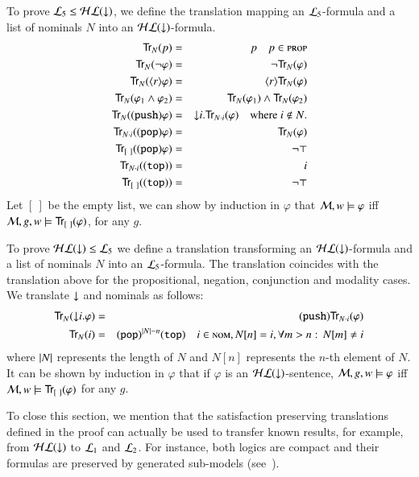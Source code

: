 \begin{pf}
To prove $\mathcal{L}_5 \le \mathcal{HL}({\downarrow})$, we define
the translation mapping an $\mathcal{L}_5$-formula and a list of
nominals $N$ into an $\mathcal{HL}({\downarrow})$-formula.
\begin{eqnarray*}
{\sf Tr}_N(p) & = & p \quad p \in \textsc{prop}\\
{\sf Tr}_N(\lnot \varphi) & = & \lnot {\sf Tr}_N(\varphi) \\
{\sf Tr}_N(\langle r \rangle \varphi) & = & \langle r \rangle {\sf Tr}_N(\varphi) \\
{\sf Tr}_N(\varphi_1 \land \varphi_2) & = & {\sf Tr}_N(\varphi_1) \land {\sf Tr}_N(\varphi_2)\\
{\sf Tr}_N({\tt (push)} \varphi) & = & {\downarrow} i. {\sf Tr}_{N\cdot i}(\varphi) \quad
\textrm{where $i \notin N$.}\\
{\sf Tr}_{N\cdot i}({\tt (pop)} \varphi) & = & {\sf Tr}_{N}(\varphi)\\
{\sf Tr}_{[\ ]}({\tt (pop)} \varphi) & = & \lnot\top\\
{\sf Tr}_{N\cdot i}({\tt (top)}) & = & i\\
{\sf Tr}_{[\ ]}({\tt (top)}) & = & \lnot\top
\end{eqnarray*}
Let $[\ ]$ be the empty list, we can show
by induction in $\varphi$ that $\mathcal{M}, w \models
\varphi$ iff $\mathcal{M}, g, w \models {\sf Tr}_{[\ ]}(\varphi)$, for any $g$.
\smallskip

\noindent
To prove $\mathcal{HL}({\downarrow}) \le \mathcal{L}_5$ we define a translation transforming an
$\mathcal{HL}({\downarrow})$-formula and a list of nominals $N$ into an $\mathcal{L}_5$-formula.
The translation coincides with the translation above for the propositional, negation,
conjunction and modality cases. We translate ${\downarrow}$ and nominals as follows:
\begin{eqnarray*}
{\sf Tr}_N({\downarrow} i.\varphi) & = & {\tt (push)}{\sf Tr}_{N\cdot i}(\varphi)\\
{\sf Tr}_N(i) & = & {\tt (pop)}^{|N|-n}{\tt (top)} \quad i \in \textsc{nom}, N[n]=i,
\forall m>n:\, N[m]\not=i
\end{eqnarray*}
where $|N|$ represents the length of $N$ and $N[n]$ represents the $n$-th element
of $N$.
It can be shown by induction in $\varphi$ that if $\varphi$ is an
$\mathcal{HL}({\downarrow})$-sentence, $\mathcal{M}, g, w \models
\varphi$ iff $\model, w \models \Tr_{[\ ]}(\varphi)$ for any $g$.
\end{pf}

To close this section, we mention that the satisfaction preserving
translations defined in the proof can actually be used to transfer
known results, for example, from  $\mathcal{HL}({\downarrow})$ to $\mathcal{L}_1$ and
$\mathcal{L}_2$.  For instance, both logics are compact and their formulas
are preserved by generated sub-models (see~\cite{areces01:_hybrid}).
